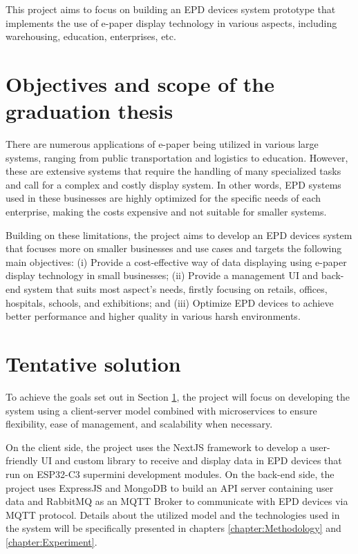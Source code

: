 \documentclass[../Main.tex]{subfiles}
\begin{document}
This project aims to focus on building an \gls{EPD} devices system prototype that implements the use of e-paper display technology in various aspects, including warehousing, education, enterprises, etc.

\section{Objectives and scope of the graduation thesis}
\label{section:1.2}
There are numerous applications of e-paper being utilized in various large systems, ranging from public transportation and logistics to education. However, these are extensive systems that require the handling of many specialized tasks and call for a complex and costly display system. In other words, \gls{EPD} systems used in these businesses are highly optimized for the specific needs of each enterprise, making the costs expensive and not suitable for smaller systems.

Building on these limitations, the project aims to develop an \gls{EPD} devices system that focuses more on smaller businesses and use cases and targets the following main objectives: (i) Provide a cost-effective way of data displaying using e-paper display technology in small businesses; (ii) Provide a management UI and back-end system that suits most aspect's needs, firstly focusing on retails, offices, hospitals, schools, and exhibitions; and (iii) Optimize \gls{EPD} devices to achieve better performance and higher quality in various harsh environments.

\section{Tentative solution}
\label{section:1.3}
To achieve the goals set out in Section \ref{section:1.2}, the project will focus on developing the system using a client-server model combined with microservices to ensure flexibility, ease of management, and scalability when necessary. 

On the client side, the project uses the NextJS framework to develop a user-friendly UI and custom library to receive and display data in \gls{EPD} devices that run on ESP32-C3 supermini development modules. On the back-end side, the project uses ExpressJS and MongoDB to build an API server containing user data and RabbitMQ as an MQTT Broker to communicate with \gls{EPD} devices via MQTT protocol. Details about the utilized model and the technologies used in the system will be specifically presented in chapters \ref{chapter:Methodology} and \ref{chapter:Experiment}.
\end{document}

